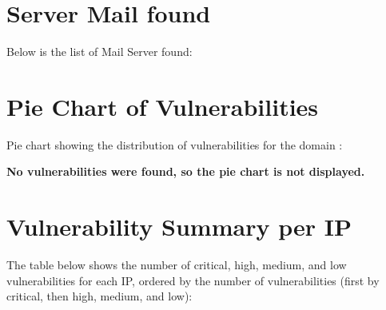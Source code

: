 \documentclass{article}
\begin{document}
{{{{{{{\clearpage

\section{Server Mail found}

Below is the list of Mail Server found:


\clearpage

\section{Pie Chart of Vulnerabilities}

\noindent Pie chart showing the distribution of vulnerabilities for the domain :

{%
\begin{figure}[H]
    \centering
\end{figure}
{%
\noindent \textbf{No vulnerabilities were found, so the pie chart is not displayed.}
{%

\clearpage

\section{Vulnerability Summary per IP}

\noindent The table below shows the number of critical, high, medium, and low vulnerabilities for each IP, ordered by the number of vulnerabilities (first by critical, then high, medium, and low):

}}}}}}}}}}
\end{document}
